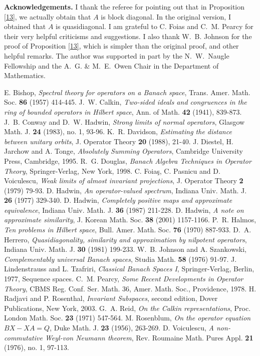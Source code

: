 \documentclass[11pt]{amsart}
\theoremstyle{definition}
\numberwithin{equation}{section}
\begin{document}
{\bf Acknowledgements.} I thank the referee for pointing out that in Proposition \ref{13}, we actually obtain that $A$ is block diagonal. In the original version, I
obtained that $A$ is quasidiagonal. I am grateful to C. Foias and C.~M. Pearcy for their very helpful criticisms and suggestions. I also thank W.~B. Johnson for the proof
of Proposition \ref{13}, which is simpler than the original proof, and other helpful remarks. The author was supported in part by the N.~W.~Naugle Fellowship and the A.~G.
\& M.~E.~Owen Chair in the Department of Mathematics.
\begin{thebibliography}{00}
 E. Bishop, {\it Spectral theory for operators on a Banach space}, Trans. Amer. Math. Soc. {\bf 86} (1957) 414-445.
 J.~W. Calkin, {\it Two-sided ideals and congruences in the ring of bounded operators in Hilbert space}, Ann. of Math. {\bf 42} (1941), 839-873.
 J.~B. Conway and D.~W. Hadwin, {\it Strong limits of normal operators}, Glasgow Math. J. {\bf 24} (1983), no. 1, 93-96.
 K.~R. Davidson, {\it Estimating the distance between unitary orbits}, J. Operator Theory {\bf 20} (1988), 21-40.
 J. Diestel, H. Jarchow and A. Tonge, {\it Absolutely Summing Operators}, Cambridge University Press, Cambridge, 1995.
 R.~G. Douglas, {\it Banach Algebra Techniques in Operator Theory}, Springer-Verlag, New York, 1998.
 C. Foia{\c{s}}, C. Pasnicu and D. Voiculescu, {\it Weak limits of almost invariant projections}, J. Operator Theory {\bf 2} (1979) 79-93.
 D. Hadwin, {\it An operator-valued spectrum}, Indiana Univ. Math. J. {\bf 26} (1977) 329-340.
 D. Hadwin, {\it Completely positive maps and approximate equivalence}, Indiana Univ. Math. J. {\bf 36} (1987) 211-228.
 D. Hadwin, {\it A note on approximate similarity}, J. Korean Math. Soc. {\bf 38} (2001) 1157-1166.
 P.~R. Halmos, {\it  Ten problems in Hilbert space}, Bull. Amer. Math. Soc. {\bf 76} (1970) 887-933.
 D.~A. Herrero, {\it Quasidiagonality, similarity and approximation by nilpotent operators}, Indiana Univ. Math. J. {\bf 30} (1981) 199-233.
 W.~B. Johnson and A. Szankowski, {\it Complementably universal Banach spaces}, Studia Math. {\bf 58} (1976) 91-97.
 J. Lindenstrauss and L. Tzafriri, {\it Classical Banach Spaces I}, Springer-Verlag, Berlin, 1977, Sequence spaces.
 C.~M. Pearcy, {\it Some Recent Developments in Operator Theory}, CBMS Reg. Conf. Ser. Math. 36, Amer. Math. Soc., Providence, 1978.
 H. Radjavi and P. Rosenthal, {\it Invariant Subspaces}, second edition, Dover Publications, New York, 2003.
 G.~A. Reid, {\it On the Calkin representations}, Proc. London Math. Soc. {\bf 23} (1971) 547-564.
 M. Rosenblum, {\it On the operator equation $BX-XA=Q$}, Duke Math. J. {\bf 23} (1956), 263-269.
 D. Voiculescu, {\it A non-commutative Weyl-von Neumann theorem}, Rev. Roumaine Math. Pures Appl. {\bf 21} (1976), no. 1, 97-113.
\end{thebibliography}
\end{document}
